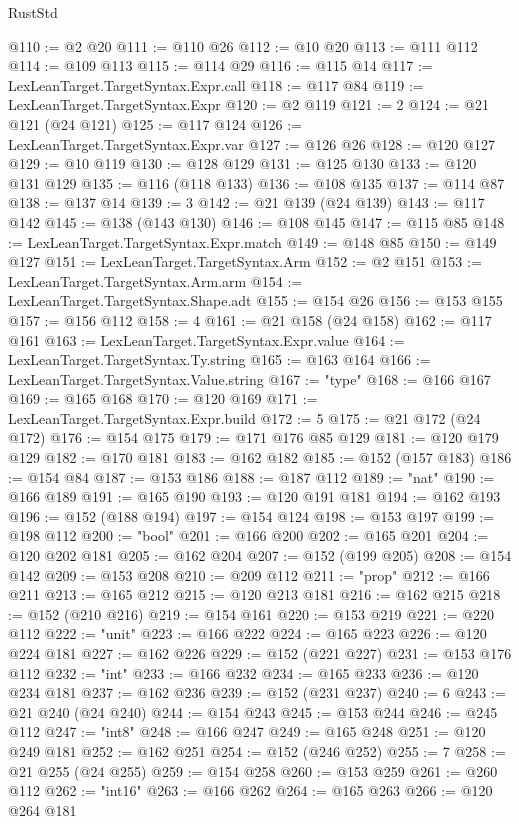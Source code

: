 \begin{lexlean}{RustStd}
\begin{coremodule}
@110 := @2 @20
@111 := @110 @26
@112 := @10 @20
@113 := @111 @112
@114 := @109 @113
@115 := @114 @29
@116 := @115 @14
@117 := LexLeanTarget.TargetSyntax.Expr.call
@118 := @117 @84
@119 := LexLeanTarget.TargetSyntax.Expr
@120 := @2 @119
@121 := 2
@124 := @21 @121 (@24 @121)
@125 := @117 @124
@126 := LexLeanTarget.TargetSyntax.Expr.var
@127 := @126 @26
@128 := @120 @127
@129 := @10 @119
@130 := @128 @129
@131 := @125 @130
@133 := @120 @131 @129
@135 := @116 (@118 @133)
@136 := @108 @135
@137 := @114 @87
@138 := @137 @14
@139 := 3
@142 := @21 @139 (@24 @139)
@143 := @117 @142
@145 := @138 (@143 @130)
@146 := @108 @145
@147 := @115 @85
@148 := LexLeanTarget.TargetSyntax.Expr.match
@149 := @148 @85
@150 := @149 @127
@151 := LexLeanTarget.TargetSyntax.Arm
@152 := @2 @151
@153 := LexLeanTarget.TargetSyntax.Arm.arm
@154 := LexLeanTarget.TargetSyntax.Shape.adt
@155 := @154 @26
@156 := @153 @155
@157 := @156 @112
@158 := 4
@161 := @21 @158 (@24 @158)
@162 := @117 @161
@163 := LexLeanTarget.TargetSyntax.Expr.value
@164 := LexLeanTarget.TargetSyntax.Ty.string
@165 := @163 @164
@166 := LexLeanTarget.TargetSyntax.Value.string
@167 := "type"
@168 := @166 @167
@169 := @165 @168
@170 := @120 @169
@171 := LexLeanTarget.TargetSyntax.Expr.build
@172 := 5
@175 := @21 @172 (@24 @172)
@176 := @154 @175
@179 := @171 @176 @85 @129
@181 := @120 @179 @129
@182 := @170 @181
@183 := @162 @182
@185 := @152 (@157 @183)
@186 := @154 @84
@187 := @153 @186
@188 := @187 @112
@189 := "nat"
@190 := @166 @189
@191 := @165 @190
@193 := @120 @191 @181
@194 := @162 @193
@196 := @152 (@188 @194)
@197 := @154 @124
@198 := @153 @197
@199 := @198 @112
@200 := "bool"
@201 := @166 @200
@202 := @165 @201
@204 := @120 @202 @181
@205 := @162 @204
@207 := @152 (@199 @205)
@208 := @154 @142
@209 := @153 @208
@210 := @209 @112
@211 := "prop"
@212 := @166 @211
@213 := @165 @212
@215 := @120 @213 @181
@216 := @162 @215
@218 := @152 (@210 @216)
@219 := @154 @161
@220 := @153 @219
@221 := @220 @112
@222 := "unit"
@223 := @166 @222
@224 := @165 @223
@226 := @120 @224 @181
@227 := @162 @226
@229 := @152 (@221 @227)
@231 := @153 @176 @112
@232 := "int"
@233 := @166 @232
@234 := @165 @233
@236 := @120 @234 @181
@237 := @162 @236
@239 := @152 (@231 @237)
@240 := 6
@243 := @21 @240 (@24 @240)
@244 := @154 @243
@245 := @153 @244
@246 := @245 @112
@247 := "int8"
@248 := @166 @247
@249 := @165 @248
@251 := @120 @249 @181
@252 := @162 @251
@254 := @152 (@246 @252)
@255 := 7
@258 := @21 @255 (@24 @255)
@259 := @154 @258
@260 := @153 @259
@261 := @260 @112
@262 := "int16"
@263 := @166 @262
@264 := @165 @263
@266 := @120 @264 @181

\end{coremodule}
\end{lexlean}
